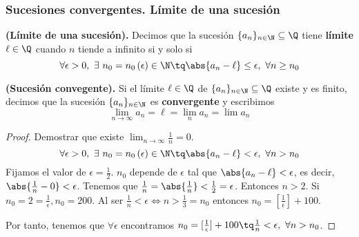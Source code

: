 \subsubsection{Sucesiones convergentes. Límite de una sucesión}
\begin{definition}
    \textbf{(Límite de una sucesión).} Decimos que la sucesión $\{a_n\}_{n\in\N}\subseteq\Q $ tiene \textbf{límite} $\ell\in\Q$ cuando $n$ tiende a infinito si y solo si
    \begin{equation}
        \forall\epsilon > 0,\ \exists\ n_0 = n_0\left( \epsilon \right)\in\N\tq \abs{a_n - \ell}\leq \epsilon,\ \forall n\geq n_0
    \end{equation}
\end{definition}
\begin{definition}
    \textbf{(Sucesión convegente).} Si el límite $\ell\in\Q$ de $\{a_n\}_{n\in\N}\subseteq\Q $ existe y es finito, decimos que la sucesión $\{a_n\}_{n\in\N} $ es \textbf{convergente} y escribimos
    \begin{equation}
        \lim_{n\to\infty} a_n = \ell = \lim_n a_n = \lim a_n
    \end{equation}
\end{definition}
\begin{proof}
    Demostrar que existe $\lim_{n\to\infty} \frac{1}{n} = 0$.
    \begin{equation}
        \forall\epsilon > 0,\ \exists\ n_0 = n_0\left( \epsilon \right) \in\N\tq \abs{a_n - \ell} < \epsilon,\ \forall n > n_0
    \end{equation}
    Fijamos el valor de $\epsilon = \frac{1}{2}$. $n_0$ depende de $\epsilon$ tal que $\abs{a_n - \ell} < \epsilon$, es decir, $\abs{\frac{1}{n} - 0} < \epsilon$. Tenemos que $\frac{1}{n}=\abs{\frac{1}{n}} < \frac{1}{2} = \epsilon$. Entonces $n > 2$. Si $n_0 = 2 = \frac{1}{\epsilon}, n_0 = 200$. Al ser $\frac{1}{n} < \epsilon\iff n > \frac{1}{3} = n_0$ entonces $n_0 = [\frac{1}{\epsilon}] + 100$.

        Por tanto, tenemos que $\forall\epsilon$ encontramos $n_0 = [\frac{1}{\epsilon}] + 100 \tq \frac{1}{n} < \epsilon,\ \forall n > n_0$.
\end{proof}

